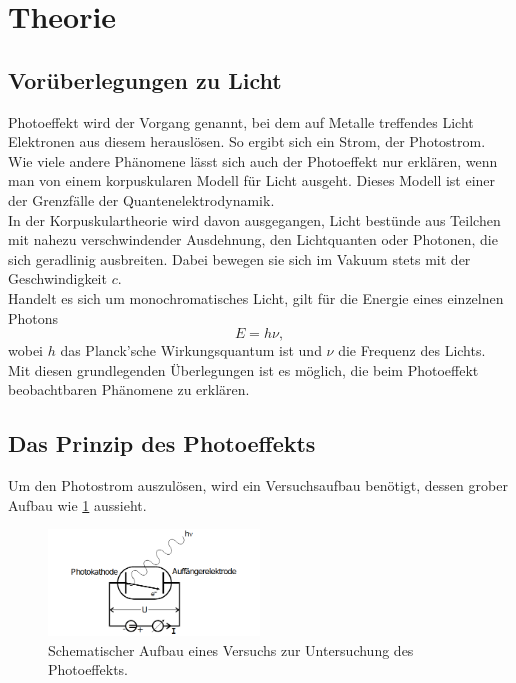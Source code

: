 \section{Theorie}
\label{sec:Theorie}

\subsection{Vorüberlegungen zu Licht}
    Photoeffekt wird der Vorgang genannt, bei dem auf Metalle treffendes Licht Elektronen aus diesem herauslösen. So ergibt 
    sich ein Strom, der Photostrom. \\
    Wie viele andere Phänomene lässt sich auch der Photoeffekt nur erklären, wenn man von einem korpuskularen Modell für 
    Licht ausgeht. Dieses Modell ist einer der Grenzfälle der Quantenelektrodynamik.\\
    In der Korpuskulartheorie wird davon ausgegangen, Licht bestünde aus Teilchen mit nahezu verschwindender Ausdehnung, 
    den Lichtquanten oder Photonen, die sich 
    geradlinig ausbreiten. Dabei bewegen sie sich im Vakuum stets mit der Geschwindigkeit $c$.\\
    Handelt es sich um monochromatisches Licht, gilt für die Energie eines einzelnen Photons
    \begin{equation}
        E = h \nu ,
        \label{eqn:energie}
    \end{equation}
    wobei $h$ das Planck'sche Wirkungsquantum ist und $\nu$ die Frequenz des Lichts. \\
    Mit diesen grundlegenden Überlegungen ist es möglich, die beim Photoeffekt beobachtbaren Phänomene zu erklären.

\subsection{Das Prinzip des Photoeffekts}
    Um den Photostrom auszulösen, wird ein Versuchsaufbau benötigt, dessen grober Aufbau wie \ref{fig:prinzip} aussieht.

    \begin{figure}
        \centering
        \includegraphics[width=0.5\textwidth]{prinzip.png}
        \caption{Schematischer Aufbau eines Versuchs zur Untersuchung des Photoeffekts.}
        \label{fig:prinzip}
    \end{figure}

